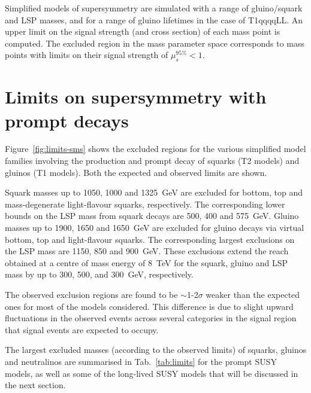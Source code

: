 Simplified models of supersymmetry are simulated with a range of gluino/squark 
and LSP masses, and for a range of gluino lifetimes in the case of T1qqqqLL. An 
upper limit on the signal strength (and cross section) of each mass point is 
computed. The excluded region in the mass parameter space corresponds to mass 
points with limits on their signal strength of $\mu_s^{95\%} < 1$. 

\section{Limits on supersymmetry with prompt decays}

Figure~\ref{fig:limits-sms} shows the excluded regions for the various 
simplified model families involving the production and prompt decay of squarks 
(T2 models) and gluinos (T1 models). Both the expected and observed limits are 
shown. 

Squark masses up to 1050, 1000 and 1325~GeV are excluded for bottom, top and 
mass-degenerate light-flavour squarks, respectively. The corresponding lower 
bounds on the LSP mass from squark decays are 500, 400 and 575~GeV. Gluino 
masses up to 1900, 1650 and 1650~GeV are excluded for gluino decays via virtual 
bottom, top and light-flavour squarks. The corresponding largest exclusions on 
the LSP mass are 1150, 850 and 900~GeV. These exclusions extend the reach 
obtained at a centre of mass energy of 8~TeV for the squark, gluino and LSP 
mass by up to 300, 500, and 300~GeV, respectively.

The observed exclusion regions are found to be $\sim$1-2$\sigma$ weaker than 
the expected ones for most of the models considered. This difference is due to 
slight upward fluctuations in the observed events across several categories in 
the signal region that signal events are expected to occupy.

The largest excluded masses (according to the observed limits) of squarks, 
gluinos and neutralinos are summarised in Tab.~\ref{tab:limits} for the prompt 
SUSY models, as well as some of the long-lived SUSY models that will be 
discussed in the next section.

